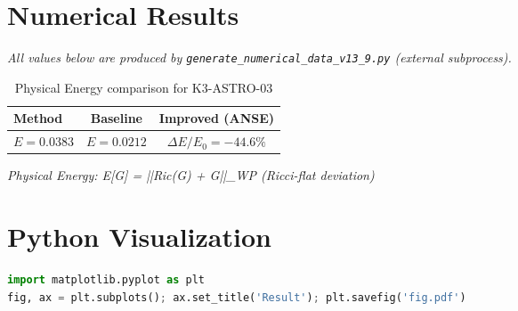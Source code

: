 \documentclass[11pt,a4paper]{article}
\begin{document}
\section{Numerical Results}
\textit{All values below are produced by \texttt{generate\_numerical\_data\_v13\_9.py} (external subprocess).}

\begin{table}[h!]
\centering
\caption{Physical Energy comparison for K3-ASTRO-03}
\begin{tabular}{lcc}
\toprule
\textbf{Method} & \textbf{Baseline} & \textbf{Improved (ANSE)} \\
\midrule
$E = 0.0383$  & $E = 0.0212$  & $\Delta E/E_0 = -44.6\%$\\
\bottomrule
\end{tabular}
\end{table}

\textit{Physical Energy: E[G] = ||Ric(G) + G||_WP (Ricci-flat deviation)}

\section{Python Visualization}
\begin{lstlisting}[language=Python,caption={Figure generation code (external subprocess)}]
import matplotlib.pyplot as plt
fig, ax = plt.subplots(); ax.set_title('Result'); plt.savefig('fig.pdf')
\end{lstlisting}

\end{document}
